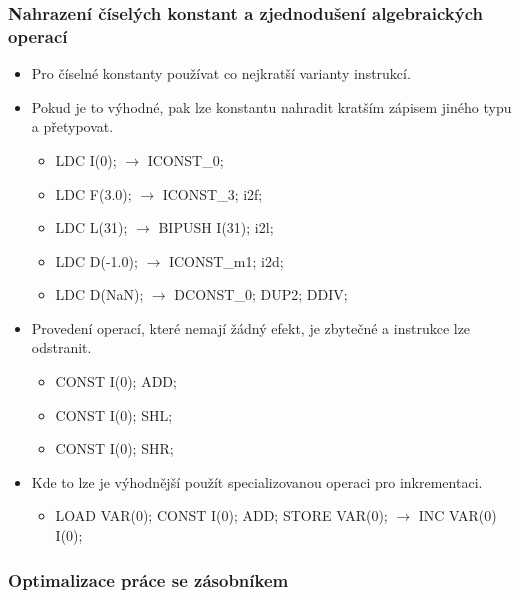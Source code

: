 \subsubsection{Nahrazení číselých konstant a zjednodušení algebraických operací}

\begin{itemize}
\item Pro číselné konstanty používat co nejkratší varianty instrukcí.

\item Pokud je to výhodné, pak lze konstantu nahradit kratším zápisem jiného typu a přetypovat.
\begin{itemize}
\item LDC I(0); $\rightarrow$ ICONST\_0;
\item LDC F(3.0); $\rightarrow$	ICONST\_3; i2f;
\item LDC L(31); $\rightarrow$	BIPUSH I(31); i2l;
\item LDC D(-1.0); $\rightarrow$ ICONST\_m1; i2d;
\item LDC D(NaN); $\rightarrow$	DCONST\_0; DUP2; DDIV;
\end{itemize}

\item Provedení operací, které nemají žádný efekt, je zbytečné a instrukce lze odstranit.
\begin{itemize}
\item CONST I(0); ADD;
\item CONST I(0); SHL;
\item CONST I(0); SHR;
\end{itemize}

\item Kde to lze je výhodnější použít specializovanou operaci pro inkrementaci.
\begin{itemize}
\item LOAD VAR(0); CONST I(0); ADD; STORE VAR(0); $\rightarrow$ INC VAR(0) I(0);
\end{itemize}

\end{itemize}

\subsubsection{Optimalizace práce se zásobníkem}


